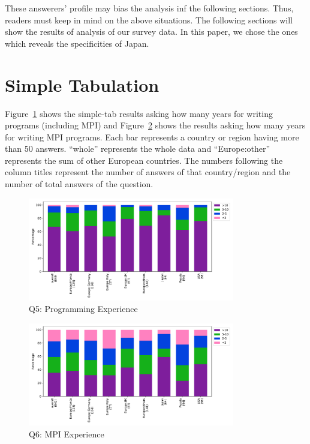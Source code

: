 \documentclass[submit,techrep,noauthor,english]{ipsj}
\begin{document}
These answerers' profile may bias the analysis inf the 
following sections. Thus, readers must keep in mind on the above
situations.
The following sections will show the results of analysis of our survey
data. In this paper, we chose the ones which reveals the specificities
of Japan. 

\section{Simple Tabulation}\label{sec:simple-tab}

Figure~\ref{fig:q5} shows the simple-tab results asking how many years
for writing programs (including MPI) and Figure~\ref{fig:q6} shows the
results asking how many years for writing MPI programs. Each bar
represents a country or region having more than 50 answers. ``whole''
represents the whole data and ``Europe:other'' represents the sum of
other European countries. The numbers
following the column titles represent the number of answers of that
country/region and the number of total answers of the question.

\begin{figure}[htb]
\begin{center}
  \includegraphics[width=9cm]{../pdfs/Q5.pdf}
  \vspace{-8mm}
\caption{Q5: Programming Experience}
\label{fig:q5}
\end{center}
\end{figure}

\begin{figure}[htb]
\begin{center}
\includegraphics[width=9cm]{../pdfs/Q6.pdf}
  \vspace{-8mm}
\caption{Q6: MPI Experience}
\label{fig:q6}
\end{center}
\end{figure}
\end{document}

